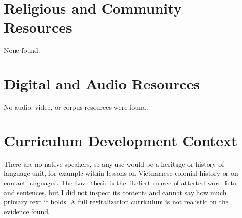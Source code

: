 \documentclass[12pt]{article}
\begin{document}
\section{Religious and Community Resources}
None found.

\section{Digital and Audio Resources}
No audio, video, or corpus resources were found.

\section{Curriculum Development Context}
There are no native speakers, so any use would be a heritage or history-of-language unit, for example within lessons on Vietnamese colonial history or on contact languages. The Love thesis is the likeliest source of attested word lists and sentences, but I did not inspect its contents and cannot say how much primary text it holds. A full revitalization curriculum is not realistic on the evidence found.
\end{document}
